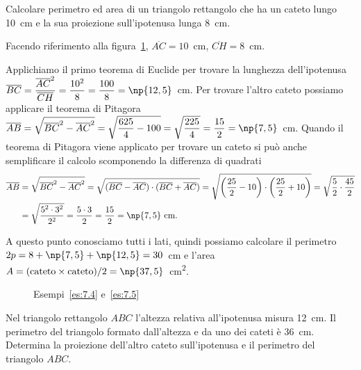 \begin{exrig}
\begin{esempio}\label{es:7.4}
Calcolare perimetro ed area di un triangolo rettangolo che ha un 
cateto lungo 10~cm e la sua proiezione sull'ipotenusa lunga 
8~cm.\vspace{7pt}

Facendo riferimento alla figura~\ref{fig:es7.4}, 
$\overline{AC}=10$~cm, $\overline{CH}=8$~cm.

Applichiamo il primo teorema di Euclide per trovare la lunghezza 
dell'ipotenusa 
$\overline{BC}=\dfrac{\overline{AC}^2}{\overline{CH}}=\dfrac{10^2}{8}
=\dfrac{100}{8}=\np{12,5}$~cm. Per trovare l'altro cateto possiamo 
applicare il teorema di Pitagora 
$\overline{AB}=\sqrt{\overline{BC}^2-\overline{AC}^2}=\sqrt{\dfrac{625
}{4}-100}=\sqrt{\dfrac{225}{4}}=\dfrac{15}{2}=\np{7,5}$~cm.
Quando il teorema di Pitagora viene applicato per trovare un cateto 
si può anche semplificare il calcolo scomponendo la differenza di 
quadrati
\begin{align*}
\overline{AB}&=\sqrt{\overline{BC}^2-\overline{AC}^2}=\sqrt{(\overline
{BC}-\overline{AC})\cdot(\overline{BC}+\overline{AC})}=\sqrt{
\left(\dfrac{25}{2}-10\right)\cdot\left(\dfrac{25}{2}+10\right)}=\sqrt
{\dfrac{5}{2}\cdot\dfrac{45}{2}}\\
&=\sqrt{\dfrac{5^2\cdot 3^2}{2^2}}=\dfrac{5\cdot 
3}{2}=\dfrac{15}{2}=\np{7,5}\text{~cm.}
\end{align*}

A questo punto conosciamo tutti i lati, quindi possiamo calcolare il 
perimetro $2p=8+\np{7,5}+\np{12,5}=30$~cm e l'area 
$A=(\text{cateto}\times\text{cateto})/2 = 
\np{37,5}$~cm\textsuperscript{2}.
\end{esempio}


\begin{inaccessibleblock}
 \begin{figure}[!htb]
	\centering
	\caption{Esempi~\ref{es:7.4} e~\ref{es:7.5}}\label{fig:es7.4}
\end{figure}
\end{inaccessibleblock}

\begin{esempio}\label{es:7.5}
Nel triangolo rettangolo $ABC$ l'altezza relativa all'ipotenusa 
misura 12~cm. Il perimetro del triangolo formato dall'altezza e da uno 
dei cateti è 36~cm. Determina la proiezione dell'altro cateto 
sull'ipotenusa e il perimetro del triangolo $ABC$.\vspace{7pt}


\end{esempio}
\end{exrig}
